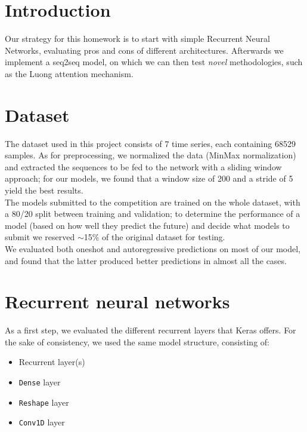 \documentclass[10.5pt,a4paper,twocolumn]{article}
\begin{document}



\section{Introduction}
\label{sec:introduction}
Our strategy for this homework is to start with simple Recurrent Neural Networks,
evaluating pros and cons of different architectures. Afterwards we implement a 
seq2seq model, on which we can then test \textit{novel} methodologies, such as 
the Luong attention mechanism.\\

\section{Dataset}
\label{sec:dataset}
The dataset used in this project consists of 7 time series, each containing 68529 samples.
As for preprocessing, we normalized the data (MinMax normalization) and extracted the
sequences to be fed to the network with a sliding window approach; 
for our models, we found that a window size of 200 and a stride of 5
yield the best results.\\
The models submitted to the competition are trained on the whole dataset, with a 80/20 split between
training and validation; to determine the performance of a model (based on how well they predict the future) 
and decide what models to submit we reserved  $\sim$15\% of the original dataset for testing.\\
We evaluated both oneshot and autoregressive predictions on most of our model, and found that the
latter produced better predictions in almost all the cases.


\section{Recurrent neural networks}
\label{sec:lstm_gru}
As a first step, we evaluated the different recurrent layers that Keras offers.
For the sake of consistency, we used the same model structure, consisting of:
\begin{itemize}
    \item Recurrent layer(s)
    \item \texttt{Dense} layer
    \item \texttt{Reshape} layer
    \item \texttt{Conv1D} layer
\end{itemize}
\end{document}
